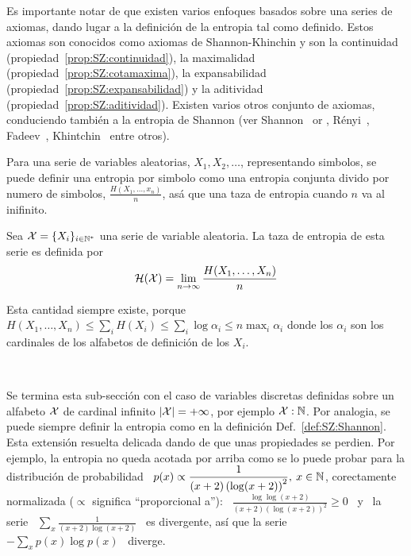 Es importante notar  de que existen varios enfoques basados  sobre una series de
axiomas, dando lugar  a la definici\'on de la entropia  tal como definido. Estos
axiomas  son conocidos  como axiomas  de Shannon-Khinchin  y son  la continuidad
(propiedad~\ref{prop:SZ:continuidad}),               la              maximalidad
(propiedad~\ref{prop:SZ:cotamaxima}),              la             expansabilidad
(propiedad~\ref{prop:SZ:expansabilidad})         y         la         aditividad
(propiedad~\ref{prop:SZ:aditividad}).  Existen varios otros conjunto de axiomas,
conduciendo tambi\'en a la entropia de Shannon (ver Shannon~\cite[Sec.~6]{Sha48}
or    \cite{ShaWea64},    R\'enyi~\cite{Ren61},   Fadeev~\cite{Fad56,    Fad58},
Khintchin~\cite{Khi57} entre otros).

Para  una  serie de  variables  aleatorias,  $X_1,  X_2, \ldots$,  representando
simbolos, se puede  definir una entropia por simbolo  como una entropia conjunta
divido por numero de simbolos, $\frac{H(X_1,\ldots,x_n)}{n}$, as\'a que una taza
de entropia cuando $n$ va al inifinito.
%
\begin{definicion}\label{def:SZ:TazaDeEntropia}
  Sea $\mathcal{X} = \{  X_i \}_{i \in \mathbb{N}^*}$ una  serie de variable aleatoria.  La taza de
  entropia de esta serie es definida por
  \[
  \mathcal{H}(\mathcal{X}) = \lim_{n \to \infty} \frac{H(X_1,\ldots,X_n)}{n}
  \]
\end{definicion}
%
\noindent Esta cantidad siempre existe, porque $H(X_1 , \ldots , X_n) \le \sum_i
H(X_i) \le \sum_i \log \alpha_i \le  n \max_i \alpha_i$ donde los $\alpha_i$ son
los cardinales de los alfabetos de definici\'on de los $X_i$.

\

Se termina esta sub-secci\'on con el caso de variables discretas definidas sobre
un  alfabeto $\mathcal{X}$ de  cardinal infinito  $|\mathcal{X}| =  + \infty$,  por ejemplo  $\mathcal{X} :
\mathbb{N}$.   Por  analogia,  se  puede  siempre  definir la  entropia  como  en  la
definici\'on Def.~\ref{def:SZ:Shannon}. Esta extensi\'on resuelta delicada dando
de que unas  propiedades se perdien.  Por ejemplo, la  entropia no queda acotada
por arriba  como se  lo puede  probar para la  distribuci\'on de  probabilidad \
$\displaystyle p(x)  \propto \frac{1}{(x+2) \left(  \log (x+2) \right)^2},  \: x
\in \mathbb{N}$, corectamente normalizada ($\propto$ significa ``proporcional a''): \
$\displaystyle \frac{\log \log(x+2)}{(x+2) \left( \log (x+2) \right)^2} \ge 0$ \
y  \  la  serie  \  $\displaystyle  \sum_x  \frac{1}{(x+2)  \log  (x+2)}$  \  es
divergente,  as\'i que  la serie  \ $\displaystyle  - \sum_x  p(x) \log  p(x)$ \
diverge.

